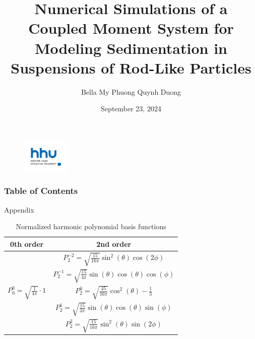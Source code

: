\documentclass[lightblue, notheorems, xcolor=dvipsnames]{beamer}
\theoremstyle{definition}
\theoremstyle{plain}
\theoremstyle{example}
\begin{document}
  \author{Bella My Phuong Quynh Duong}
  \date{September 23, 2024} %
  \title{Numerical Simulations of a Coupled Moment System for Modeling Sedimentation in Suspensions of Rod-Like Particles}
  
  \begin{frame}
  	\titlepage
  	\begin{figure}[htpb]
  		\begin{center}
  			\includegraphics[width=0.2\textwidth]{logo.png}
  		\end{center}
  	\end{figure}
  \end{frame}
\begin{frame}
   \frametitle{Table of Contents}
\tableofcontents %
\end{frame}








\begin{frame}{Appendix}
		\begin{table}[H]
			\scriptsize
			\begin{tabular}{|c|c|}
				\hline
				0th order	& 2nd order \\
				\hline
				& $P^{-2}_2 = \sqrt{\frac{15}{16\pi}}\sin^2(\theta)\cos(2\phi)$ \\
				& $P^{-1}_2 = \sqrt{\frac{15}{4\pi}}\sin(\theta)\cos(\theta)\cos(\phi)$ \\
				$P^0_0 = \sqrt{\frac{1}{4\pi}} \cdot 1$	& $P^0_2 = \sqrt{\frac{45}{16\pi}}\cos^2(\theta) - \frac{1}{3}$  \\
				&  $P^1_2 = \sqrt{\frac{15}{4\pi}}\sin(\theta)\cos(\theta)\sin(\phi)$\\
				&  $P^2_2 = \sqrt{\frac{15}{16\pi}}\sin^2(\theta)\sin(2\phi)$\\
				\hline
			\end{tabular}
			\caption{Normalized harmonic polynomial basis functions}
		\end{table}
\end{frame}
\end{document}
